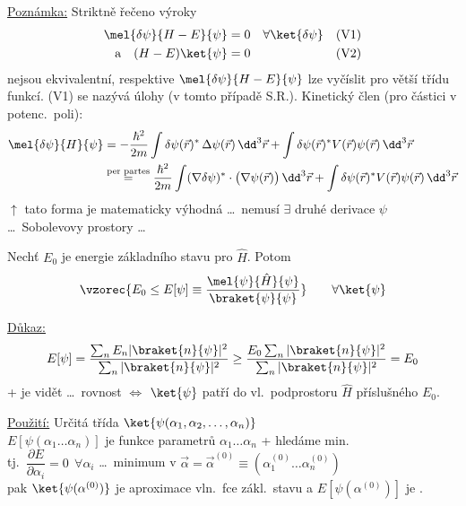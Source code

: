 \underline{Poznámka:} Striktně řečeno výroky
\begin{align*}
  \mel{\delta\psi}{H - E}{\psi} &= 0 \quad \forall\ket{\delta\psi} && \text{(V1)} \\
  \text{a}\quad (H - E)\ket{\psi} &= 0 && \text{(V2)}
\end{align*}
nejsou ekvivalentní, respektive $\mel{\delta\psi}{H - E}{\psi}$ lze vyčíslit pro větší třídu funkcí. (V1) se nazývá  úlohy (v tomto případě S.R.). Kinetický člen (pro částici v potenc.\ poli):
\begin{align*}
  \mel{\delta\psi}{H}{\psi} &= -\frac{\hbar^2}{2m}\int\delta\psi(\vec r)^*\,\Delta\psi(\vec r)\,\dd^3\vec r + \int\delta\psi(\vec r)^*V(\vec r)\psi(\vec r)\,\dd^3\vec r \\
  &\overset{\text{per partes}}{=} \frac{\hbar^2}{2m}\int(\nabla\delta\psi)^*\cdot\big(\nabla\psi(\vec r)\big)\,\dd^3\vec r + \int\delta\psi(\vec r)^*V(\vec r)\psi(\vec r)\,\dd^3\vec r
\end{align*}
$\uparrow$ tato forma je matematicky výhodná \dots\ nemusí $\exists$ druhé derivace $\psi$ \\
\dots\ Sobolevovy prostory \dots

\begin{veta}[Tvrzení 2]
Nechť $E_0$ je energie základního stavu pro $\hat H$. Potom
\[
  \vzorec{E_0 \leq E[\psi] \equiv \frac{\mel{\psi}{\hat H}{\psi}}{\braket{\psi}{\psi}}} \qquad \forall\ket{\psi}
\]
\end{veta}

\underline{Důkaz:}
\[
  E[\psi] = \frac{\sum_n E_n|\braket{n}{\psi}|^2}{\sum_n|\braket{n}{\psi}|^2} \geq \frac{E_0\sum_n|\braket{n}{\psi}|^2}{\sum_n|\braket{n}{\psi}|^2} = E_0
\]
+ je vidět \dots\ rovnost $\Leftrightarrow$ $\ket{\psi}$ patří do vl.\ podprostoru $\hat H$ příslušného $E_0$.

\underline{Použití:} Určitá třída  $\ket{\psi(\alpha_1,\alpha_2,\dots,\alpha_n)}$ \\
\quad $E[\psi(\alpha_1\dots\alpha_n)]$ je funkce parametrů $\alpha_1\dots\alpha_n$ + hledáme min. \\
\quad tj.\ $\dfrac{\partial E}{\partial\alpha_i} = 0\ \ \forall\alpha_i$ \quad \dots\ minimum v $\vec\alpha = \vec\alpha^{(0)} \equiv (\alpha_1^{(0)}\dots\alpha_n^{(0)})$ \\
\quad pak $\ket{\psi(\alpha^{(0)})}$ je aproximace vln.\ fce zákl.\ stavu a $E[\psi(\alpha^{(0)})]$ je .

